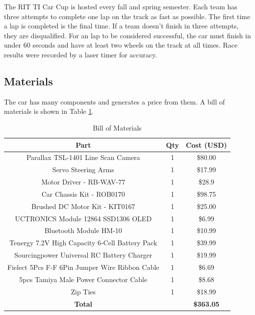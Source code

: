\documentclass[conference]{IEEEtran}
\begin{document}
The RIT TI Car Cup is hosted every fall and spring semester. Each team has three attempts to complete one lap on the track as fast as possible. The first time a lap is completed is the final time. If a team doesn't finish in three attempts, they are disqualified. For an lap to be considered successful, the car must finish in under 60 seconds and have at least two wheels on the track at all times. Race results were recorded by a laser timer for accuracy.

\subsection{Materials}

The car has many components and generates a price from them. A bill of materials \cite{b2} is shown in Table \ref{table:billOfMaterials}.

\begin{table}[htbp]
\caption{Bill of Materials}
\begin{center}
\begin{tabular}{|c|c|c|}
\hline
Part & Qty & Cost (USD) \\
\hline
Parallax TSL-1401 Line Scan Camera & 1 & \$80.00 \\
\hline
Servo Steering Arms & 1 & \$17.99 \\
\hline
Motor Driver - RB-WAV-77 & 1 & \$28.9 \\
\hline
Car Chassis Kit - ROB0170 & 1 & \$98.75 \\
\hline
Brushed DC Motor Kit - KIT0167 & 1 & \$25.00 \\
\hline
UCTRONICS Module 12864 SSD1306 OLED & 1 & \$6.99 \\
\hline
Bluetooth Module HM-10 & 1 & \$10.99 \\
\hline
Tenergy 7.2V High Capacity 6-Cell Battery Pack & 1 & \$39.99 \\
\hline
Sourcingpower Universal RC Battery Charger & 1 & \$19.99 \\
\hline
Fielect 5Pcs F-F 6Pin Jumper Wire Ribbon Cable & 1 & \$6.69 \\
\hline
5pcs Tamiya Male Power Connector Cable & 1 & \$8.68 \\
\hline
Zip Ties & 1 & \$18.99 \\
\hline
\textbf{Total} & & \textbf{\$363.05} \\
\hline
\end{tabular}
\label{table:billOfMaterials}
\end{center}
\end{table}
\end{document}
